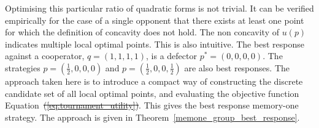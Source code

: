 \documentclass[fleqn,10pt]{wlscirep}
\providecommand{\DIFadd}[1]{{\protect\color{blue}\uwave{#1}}} %
\providecommand{\DIFdel}[1]{{\protect\color{red}\sout{#1}}}                      %
\providecommand{\DIFaddbegin}{} %
\providecommand{\DIFaddend}{} %
\providecommand{\DIFdelbegin}{} %
\providecommand{\DIFdelend}{} %
\begin{document}
Optimising this particular ratio of quadratic forms is not trivial. It can be
verified empirically for the case of a single opponent that there exists at
least one point for which the definition of concavity does not hold.
The non concavity of \(u(p)\) indicates multiple local
optimal points. This is also intuitive. The best response against a cooperator,
\(q=(1, 1, 1, 1)\), is a defector \(p^*=(0, 0, 0, 0)\). The strategies
\(p=(\frac{1}{2}, 0, 0, 0)\) and \(p=(\frac{1}{2}, 0, 0, \frac{1}{2})\) are also
best responses. The approach taken here is to introduce a compact way of
constructing the discrete candidate set of all local optimal points, and evaluating
the objective function Equation~\DIFdelbegin \DIFdel{(\ref{eq:tournament_utility})}\DIFdelend \DIFaddbegin \DIFadd{\ref{eq:tournament_utility}}\DIFaddend . This gives the best
response memory-one strategy. The approach is given in
Theorem~\ref{memone_group_best_response}.
\end{document}
